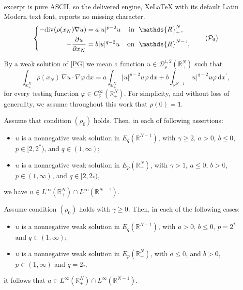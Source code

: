 \documentclass[10pt,a4paper]{amsart}
\begin{document}
excerpt is pure ASCII, so the delivered engine, XeLaTeX with its default Latin Modern text font, reports no missing character.
  \begin{equation}\label{PG}
		\left\{
		\begin{aligned}
			-\mathrm{div}(\rho(x_N) \nabla u) &=a|u|^{p-2}u &\mbox{in }&\ \mathds{R}^N_+,
			\vspace{0.2cm}\\
			-\frac{\partial u}{\partial x_N}&=b|u|^{q-2}u&\mbox{on }&\
			\mathds{R}^{N-1},
		\end{aligned}
		\right. 
		\tag{$\mathcal{P}_0$}
	\end{equation}

\begin{definition} By a weak solution of \eqref{PG} we mean a function  
$ u \in \mathcal{D}^{1,2}_\rho(\mathds{R}^N_+)$
such that  
\begin{equation}\label{weak solution}
   \int_{\mathds{R}^{N}_+} \rho(x_N)\,\nabla u \cdot \nabla \varphi \, \mathrm{d}x
   = a \int_{\mathds{R}^{N}_+} |u|^{p-2}u \varphi \, \mathrm{d}x  
   + b \int_{\mathds{R}^{N-1}} |u|^{q-2}u \varphi \, \mathrm{d}x^\prime,
\end{equation}
for every testing function $\varphi \in C_\delta^\infty(\mathds{R}^N_+)$.  
For simplicity, and without loss of generality, we assume throughout this work that $\rho(0)=1$.

\end{definition}

\begin{lemma}\label{Linfty}
Assume that condition $(\rho_0)$ holds. Then, in each of following assertions:
\begin{itemize}
    \item[$(i)$]  $u$ is a nonnegative weak solution in $E_q(\mathds{R}^{N-1})$, with $\gamma\geq 2$, $a > 0$, $b \leq 0$, $p \in [2,2^\ast)$, and $q \in (1,\infty)$;
    \item[$(ii)$]  $u$ is a nonnegative weak solution in $E_p(\mathds{R}^N_+)$, with $\gamma>1$, $a \leq 0$, $b > 0$, $p \in (1,\infty)$, and $q \in [2, 2_\ast)$,
\end{itemize}
we have $u \in L^\infty(\mathds{R}^N_+) \cap L^\infty(\mathds{R}^{N-1})$.
\end{lemma}

\begin{lemma}\label{Linfty 2}
Assume condition $(\rho_0)$ holds with $\gamma\geq 0$. Then, in each of the following cases:
\begin{itemize}
\item[$(i)$] $u$ is a nonnegative weak solution in $E_q(\mathds{R}^{N-1})$, with $a > 0$, $b \leq 0$, $p=2^\ast$ and $q\in(1,\infty)$;
\item[$(ii)$] $u$ is a nonnegative weak solution in $E_p(\mathds{R}^N_+)$, with $a \leq 0$, and $b > 0$, $p\in(1,\infty)$ and $q=2_\ast$,
\end{itemize}
it follows that $u \in L^\infty(\mathds{R}^N_+) \cap L^\infty(\mathds{R}^{N-1})$.
\end{lemma}
\end{document}
